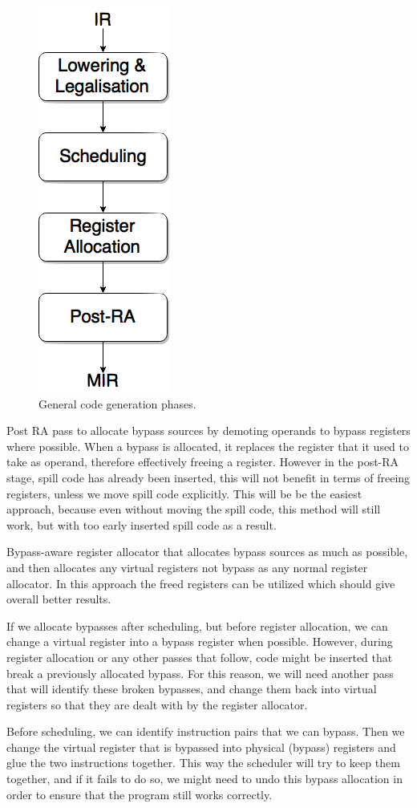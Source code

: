 


\begin{figure}[H]
\centering
\includegraphics[width=.15\textwidth]{figures/phase_ordering}
\caption{General code generation phases.}
\label{fig:phase_ordering}
\end{figure}

Post RA pass to allocate bypass sources by demoting operands to bypass registers where possible.
When a bypass is allocated, it replaces the register that it used to take as operand, therefore effectively freeing a register. However in the post-RA stage, spill code has already been inserted, this will not benefit in terms of freeing registers, unless we move spill code explicitly. This will be be the easiest approach, because even without moving the spill code, this method will still work, but with too early inserted spill code as a result.

Bypass-aware register allocator that allocates bypass sources as much as possible, and then allocates any virtual registers not bypass as any normal register allocator. In this approach the freed registers can be utilized which should give overall better results.

If we allocate bypasses after scheduling, but before register allocation, we can change a virtual register into a bypass register when possible. However, during register allocation or any other passes that follow, code might be inserted that break a previously allocated bypass. For this reason, we will need another pass that will identify these broken bypasses, and change them back into virtual registers so that they are dealt with by the register allocator.

Before scheduling, we can identify instruction pairs that we can bypass. Then we change the virtual register that is bypassed into physical (bypass) registers and glue the two instructions together. This way the scheduler will try to keep them together, and if it fails to do so, we might need to undo this bypass allocation in order to ensure that the program still works correctly.


